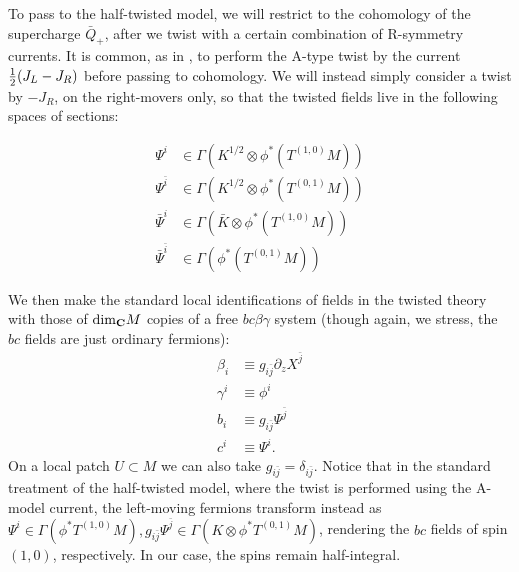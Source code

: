 \documentclass[../main.tex]{subfiles}
\begin{document}
To pass to the half-twisted model, we will restrict to the cohomology of the supercharge $\bar{Q}_+$, after we twist with a certain combination of R-symmetry currents. It is common, as in  \cite{Kapustin}, to perform the A-type twist by the current ${1 \over 2}(J_L - J_R)$ before passing to cohomology. We will instead simply consider a twist by $-J_R$, on the right-movers only, so that the twisted fields live in the following spaces of sections:

\begin{align*}
\Psi^i &\in \Gamma(K^{1/2}\otimes \phi^*(T^{(1,0)}M))\\
\Psi^{\bar{i}} &\in \Gamma(K^{1/2}\otimes \phi^*(T^{(0,1)}M))\\
\bar{\Psi}^i &\in \Gamma(\bar{K} \otimes\phi^*(T^{(1,0)}M))\\
\bar{\Psi}^{\bar{i}} &\in  \Gamma(\phi^*(T^{(0,1)}M))
\end{align*} 

We then make the standard local identifications of fields in the twisted theory with those of ${\rm dim}_{\mathbf{C}}M$ copies of a free $bc\beta\gamma$ system (though again, we stress, the $bc$ fields are just ordinary fermions):
\begin{align*}
\beta_i &\equiv g_{i \bar{j}}\partial_z X^{\bar{j}} \\
\gamma^i &\equiv \phi^i \\
b_i &\equiv g_{i \bar{j}} \Psi^{\bar{j}} \\
c^i &\equiv \Psi^i.
\end{align*}
On a local patch $U \subset M$ we can also take $g_{i\bar{j}} = \delta_{i \bar{j}}$.
Notice that in the standard treatment of the half-twisted model, where the twist is performed using the A-model current, the left-moving fermions transform instead as $\Psi^i \in \Gamma(\phi^* T^{(1, 0)}M), g_{i \bar{j}}\Psi^{\bar{j}} \in \Gamma(K \otimes \phi^* T^{(0, 1)}M)$, rendering the $bc$ fields of spin $(1, 0)$, respectively. In our case, the spins remain half-integral.
\end{document}
